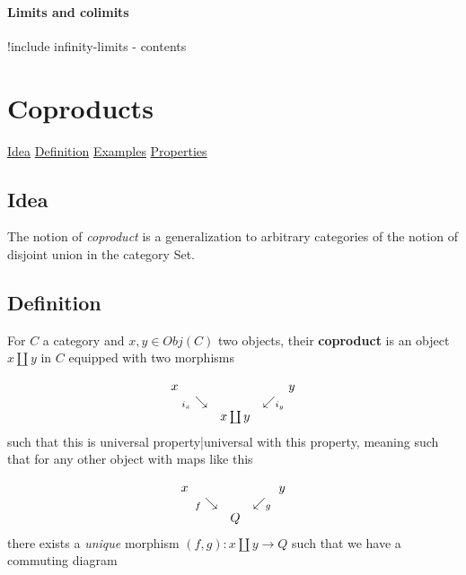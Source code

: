 \documentclass[preprint, 5p, 10pt]{elsarticle}
\theoremstyle{plain}
\def\mathllap{\mathpalette\mathllapinternal}
\def\mathrlap{\mathpalette\mathrlapinternal}
\def\mathllapinternal#1#2{\llap{$\mathsurround=0pt#1{#2}$}}
\def\mathrlapinternal#1#2{\rlap{$\mathsurround=0pt#1{#2}$}}
\newcommand{\itexarray}[1]{\begin{matrix}#1\end{matrix}}
\begin{document}
\hypertarget{limits_and_colimits_3}{}\paragraph*{{Limits and colimits}}\label{limits_and_colimits_3}

!include infinity-limits - contents

\hypertarget{coproducts_4}{}\section*{{Coproducts}}\label{coproducts_4}

\noindent\hyperlink{idea_5}{Idea}\dotfill \pageref*{idea_5} \linebreak
\noindent\hyperlink{definition_6}{Definition}\dotfill \pageref*{definition_6} \linebreak
\noindent\hyperlink{examples_7}{Examples}\dotfill \pageref*{examples_7} \linebreak
\noindent\hyperlink{properties_8}{Properties}\dotfill \pageref*{properties_8} \linebreak


\hypertarget{idea_5}{}\subsection*{{Idea}}\label{idea_5}

The notion of \emph{coproduct} is a generalization to arbitrary categories of the notion of disjoint union in the category Set.

\hypertarget{definition_6}{}\subsection*{{Definition}}\label{definition_6}

For $C$ a category and $x, y \in Obj(C)$ two objects, their \textbf{coproduct} is an object $x \coprod y$ in $C$ equipped with
 two morphisms

\begin{displaymath}
\itexarray{
    x &&&& y
    \\
    & {}_{\mathllap{i_x}}\searrow && \swarrow_{\mathrlap{i_y}}
    \\
    && x \coprod y
  }
\end{displaymath}
such that this is universal property|universal with this property, meaning such that for any other object with maps like this

\begin{displaymath}
\itexarray{
    x &&&& y
    \\
    & {}_{\mathllap{f}}\searrow && \swarrow_{\mathrlap{g}}
    \\
    && Q
  }
\end{displaymath}
there exists a \emph{unique} morphism $(f,g) :  x \coprod y \to Q$ such that we have a commuting diagram
\end{document}
